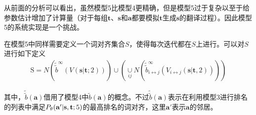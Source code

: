 \begin{appendices}
\parinterval 从前面的分析可以看出，虽然模型5比模型4更精确，但是模型5过于复杂以至于给参数估计增加了计算量（对于每组$\mathbf{t}$、$\mathbf{s}$和$\mathbf{a}$都要模拟$\mathbf{t}$生成$\mathbf{s}$的翻译过程）。因此模型5的系统实现是一个挑战。

\parinterval 在模型5中同样需要定义一个词对齐集合$S$，使得每次迭代都在$S$上进行。可以对$S$进行如下定义
\begin{eqnarray}
\textrm{S} = N(\tilde{\tilde{b}}^{\infty}(V(\mathbf{s}|\mathbf{t};2))) \cup (\mathop{\cup}\limits_{ij} N(\tilde{\tilde{b}}_{i \leftrightarrow j}^{\infty}(V_{i \leftrightarrow j}(\mathbf{s}|\mathbf{t},2))))
\label{eq:1.29}
\end{eqnarray}
\vspace{0.5em}

\noindent 其中，$\tilde{\tilde{b}}(\mathbf{a})$借用了模型4中$\tilde{b}(\mathbf{a})$的概念。不过$\tilde{\tilde{b}}(\mathbf{a})$表示在利用模型3进行排名的列表中满足${P}_{\theta}(\mathbf{a}'|\mathbf{s},\mathbf{t};5)$的最高排名的词对齐，这里$\mathbf{a}'$表示$\mathbf{a}$的邻居。
\end{appendices}














